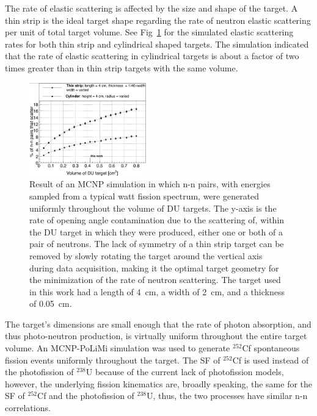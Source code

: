 \documentclass[%
 reprint,
 amsmath,amssymb,
 aps,
 nofootinbib
]{revtex4-1}
\begin{document}
The rate of elastic scattering is affected by the size and shape of the target.
A thin strip is the ideal target shape regarding the rate of neutron elastic scattering per unit of total target volume.
See Fig~\ref{fig:ElasticScatteringPlot} for the simulated elastic scattering rates for both thin strip and cylindrical shaped targets.
The simulation indicated that the rate of elastic scattering in cylindrical targets is about a factor of two times greater than in thin strip targets with the same volume.
\begin{figure}
    \centering
    \includegraphics[width = 0.45\textwidth]{ElasticScatteringPlot.png}
    \caption{
     Result of an MCNP simulation in which n-n pairs, with energies sampled from a typical watt fission spectrum, were generated uniformly throughout the volume of DU targets.
        The y-axis is the rate of opening angle contamination due to the scattering of, within the DU target in which they were produced, either one or both of a pair of neutrons.
    The lack of symmetry of a thin strip target can be removed by slowly rotating the target around the vertical axis during data acquisition, making it the optimal target geometry for the minimization of the rate of neutron scattering.
    The target used in this work had a length of 4~cm, a width of 2~cm, and a thickness of 0.05~cm.
    }
    \label{fig:ElasticScatteringPlot}
\end{figure}

The target's dimensions are small enough that the rate of photon absorption, and thus photo-neutron production, is virtually uniform throughout the entire target volume.
An MCNP-PoLiMi simulation was used to generate $^{252}$Cf spontaneous fission events uniformly throughout the target.
The SF of $^{252}$Cf is used instead of the photofission of $^{238}$U because of the current lack of photofission models, however, the underlying fission kinematics are, broadly speaking, the same for the SF of $^{252}$Cf and the photofission of $^{238}$U, thus, the two processes have similar n-n correlations.
\end{document}
